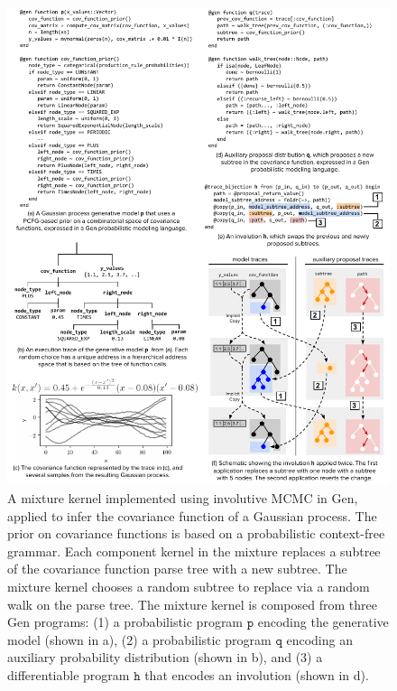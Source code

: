 \documentclass[twoside]{article}
\begin{document}
\begin{figure}[ht]
    \centering
    \includegraphics[width=\textwidth]{figures/structure-learning.pdf}
    \caption{
A mixture kernel implemented using involutive MCMC in Gen, applied to infer the covariance function of a Gaussian process.
The prior on covariance functions is based on a probabilistic context-free grammar.
Each component kernel in the mixture replaces a subtree of the covariance function parse tree with a new subtree.
The mixture kernel chooses a random subtree to replace via a random walk on the parse tree.
The mixture kernel is composed from three Gen programs:
(1) a probabilistic program $\mathtt{p}$ encoding the generative model (shown in a),
(2) a probabilistic program $\mathtt{q}$ encoding an auxiliary probability distribution (shown in b), and
(3) a differentiable program $\mathtt{h}$ that encodes an involution (shown in d).
}
    \label{fig:structure-learning}
\end{figure}
\end{document}
